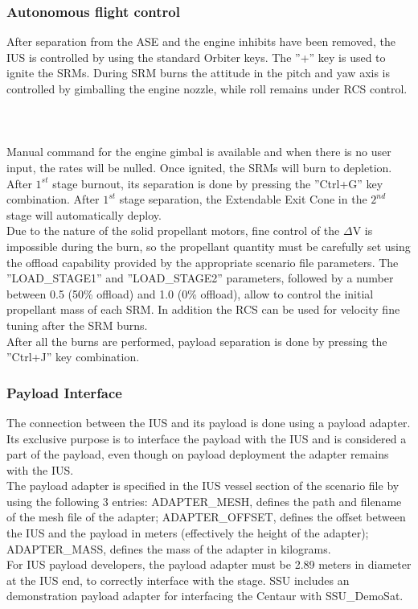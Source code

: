 \documentclass[Space_Shuttle_Ultra_Manual.tex]{subfiles}
\begin{document}
\begin{multicols*}{2}
\subsubsection{Autonomous flight control}
After separation from the ASE and the engine inhibits have been removed, the IUS is controlled by using the standard Orbiter keys. The ''+'' key is used to ignite the SRMs. During SRM burns the attitude in the pitch and yaw axis is controlled by gimballing the engine nozzle, while roll remains under RCS control.
\\
\\
\\
\\
Manual command for the engine gimbal is available and when there is no user input, the rates will be nulled. Once ignited, the SRMs will burn to depletion.\\
After $1^{st}$ stage burnout, its separation is done by pressing the ''Ctrl+G'' key combination. After $1^{st}$ stage separation, the Extendable Exit Cone in the $2^{nd}$ stage will automatically deploy.\\
Due to the nature of the solid propellant motors, fine control of the $\Delta$V is impossible during the burn, so the propellant quantity must be carefully set using the offload capability provided by the appropriate scenario file parameters. The ''LOAD\_STAGE1'' and ''LOAD\_STAGE2'' parameters, followed by a number between 0.5 (50\% offload) and 1.0 (0\% offload), allow to control the initial propellant mass of each SRM. In addition the RCS can be used for velocity fine tuning after the SRM burns.\\
After all the burns are performed, payload separation is done by pressing the ''Ctrl+J'' key combination.

\subsubsection{Payload Interface}
The connection between the IUS and its payload is done using a payload adapter. Its exclusive purpose is to interface the payload with the IUS and is considered a part of the payload, even though on payload deployment the adapter remains with the IUS.\\
The payload adapter is specified in the IUS vessel section of the scenario file by using the following 3 entries: ADAPTER\_MESH, defines the path and filename of the mesh file of the adapter; ADAPTER\_OFFSET, defines the offset between the IUS and the payload in meters (effectively the height of the adapter); ADAPTER\_MASS, defines the mass of the adapter in kilograms.\\
For IUS payload developers, the payload adapter must be 2.89 meters in diameter at the IUS end, to correctly interface with the stage. SSU includes an demonstration payload adapter for interfacing the Centaur with SSU\_DemoSat.

\end{multicols*}
\end{document}
